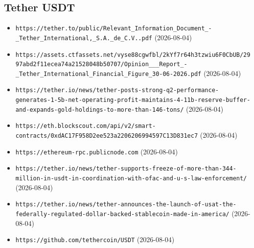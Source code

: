 \subsection*{Tether USDT}
\begin{itemize}\setlength{\itemsep}{0pt}\small
\item \texttt{https://tether.to/public/Relevant\_Information\_Document\_-\_Tether\_International,\_S.A.\_de\_C.V..pdf} (2026-08-04)
\item \texttt{https://assets.ctfassets.net/vyse88cgwfbl/2kYf7r64h3tzwiu6F0CbUB/2997abd2f11ecea74a21528048b50707/Opinion\_\_\_Report\_-\_Tether\_International\_Financial\_Figure\_30-06-2026.pdf} (2026-08-04)
\item \texttt{https://tether.io/news/tether-posts-strong-q2-performance-generates-1-5b-net-operating-profit-maintains-4-11b-reserve-buffer-and-expands-gold-holdings-to-more-than-146-tons/} (2026-08-04)
\item \texttt{https://eth.blockscout.com/api/v2/smart-contracts/0xdAC17F958D2ee523a2206206994597C13D831ec7} (2026-08-04)
\item \texttt{https://ethereum-rpc.publicnode.com} (2026-08-04)
\item \texttt{https://tether.io/news/tether-supports-freeze-of-more-than-344-million-in-usdt-in-coordination-with-ofac-and-u-s-law-enforcement/} (2026-08-04)
\item \texttt{https://tether.io/news/tether-announces-the-launch-of-usat-the-federally-regulated-dollar-backed-stablecoin-made-in-america/} (2026-08-04)
\item \texttt{https://github.com/tethercoin/USDT} (2026-08-04)
\end{itemize}

